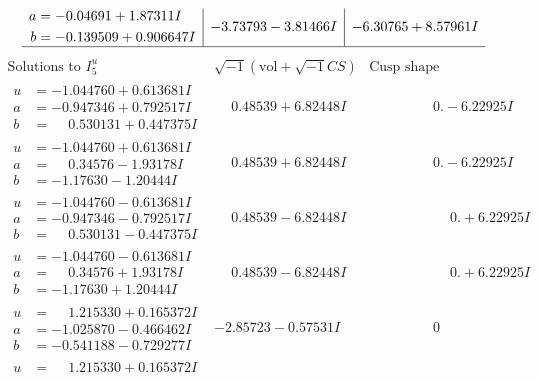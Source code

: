 \documentclass[1p]{elsarticle_modified}
\theoremstyle{definition}
\newcommand{\I}{\sqrt{-1}}
\begin{document}
$$\begin{array}{c|c|c}
\begin{aligned}
a &= -0.04691 + 1.87311 I \\
b &= -0.139509 + 0.906647 I\end{aligned}
 & -3.73793 - 3.81466 I & -6.30765 + 8.57961 I\\
 \hline 
 \end{array}$$\newpage$$\begin{array}{c|c|c}  
\text{Solutions to }I^u_{5}& \I (\text{vol} + \sqrt{-1}CS) & \text{Cusp shape}\\
 \hline 
\begin{aligned}
u &= -1.044760 + 0.613681 I \\
a &= -0.947346 + 0.792517 I \\
b &= \phantom{-}0.530131 + 0.447375 I\end{aligned}
 & \phantom{-}0.48539 + 6.82448 I & \phantom{-0.000000 } 0. - 6.22925 I \\ \hline\begin{aligned}
u &= -1.044760 + 0.613681 I \\
a &= \phantom{-}0.34576 - 1.93178 I \\
b &= -1.17630 - 1.20444 I\end{aligned}
 & \phantom{-}0.48539 + 6.82448 I & \phantom{-0.000000 } 0. - 6.22925 I \\ \hline\begin{aligned}
u &= -1.044760 - 0.613681 I \\
a &= -0.947346 - 0.792517 I \\
b &= \phantom{-}0.530131 - 0.447375 I\end{aligned}
 & \phantom{-}0.48539 - 6.82448 I & \phantom{-0.000000 -}0. + 6.22925 I \\ \hline\begin{aligned}
u &= -1.044760 - 0.613681 I \\
a &= \phantom{-}0.34576 + 1.93178 I \\
b &= -1.17630 + 1.20444 I\end{aligned}
 & \phantom{-}0.48539 - 6.82448 I & \phantom{-0.000000 -}0. + 6.22925 I \\ \hline\begin{aligned}
u &= \phantom{-}1.215330 + 0.165372 I \\
a &= -1.025870 - 0.466462 I \\
b &= -0.541188 - 0.729277 I\end{aligned}
 & -2.85723 - 0.57531 I & \phantom{-0.000000 } 0 \\ \hline\begin{aligned}
u &= \phantom{-}1.215330 + 0.165372 I \\

\end{aligned}
\end{array}$$
\end{document}
